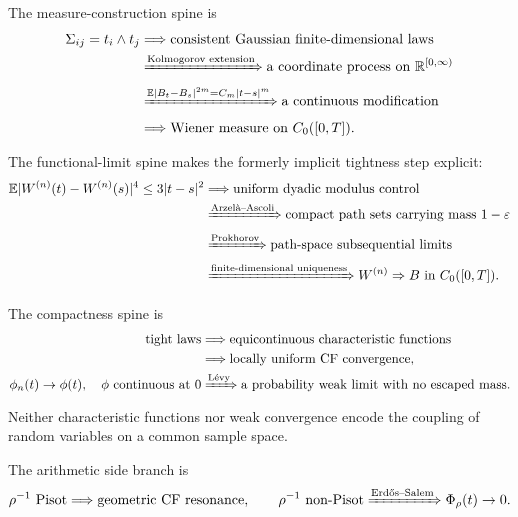 \documentclass[10pt,a4paper]{article}
\numberwithin{equation}{section}
\theoremstyle{blueplain}
\theoremstyle{definition}
\newcommand{\E}{\mathbb E}
\newcommand{\R}{\mathbb R}
\begin{document}
The measure-construction spine is
\begin{align*}
 \Sigma_{ij}=t_i\wedge t_j
 &\Longrightarrow \text{consistent Gaussian finite-dimensional laws}\\
 &\xRightarrow{\text{Kolmogorov extension}}
 \text{a coordinate process on }\R^{[0,\infty)}\\
 &\xRightarrow{\E|B_t-B_s|^{2m}=C_m|t-s|^m}
 \text{a continuous modification}\\
 &\Longrightarrow \text{Wiener measure on }C_0([0,T]).
\end{align*}

The functional-limit spine makes the formerly implicit tightness step explicit:
\begin{align*}
 \E|W^{(n)}(t)-W^{(n)}(s)|^4\le3|t-s|^2
 &\Longrightarrow \text{uniform dyadic modulus control}\\
 &\xRightarrow{\text{Arzel\`a--Ascoli}}
 \text{compact path sets carrying mass }1-\varepsilon\\
 &\xRightarrow{\text{Prokhorov}}
 \text{path-space subsequential limits}\\
 &\xRightarrow{\text{finite-dimensional uniqueness}}
 W^{(n)}\Rightarrow B\text{ in }C_0([0,T]).
\end{align*}

The compactness spine is
\begin{align*}
  \text{tight laws}
  &\Longrightarrow
  \text{equicontinuous characteristic functions}\\
  &\Longrightarrow
  \text{locally uniform CF convergence},\\
  \phi_n(t)\to\phi(t),\quad \phi\text{ continuous at }0
  &\xRightarrow{\text{L\'evy}}
  \text{a probability weak limit with no escaped mass}.
\end{align*}
Neither characteristic functions nor weak convergence encode the coupling of
random variables on a common sample space.

The arithmetic side branch is
\[
  \rho^{-1}\text{ Pisot}
  \Longrightarrow\text{geometric CF resonance},
  \qquad
  \rho^{-1}\text{ non-Pisot}
  \xRightarrow{\text{Erd\H{o}s--Salem}}
  \Phi_\rho(t)\to0.
\]
\end{document}
